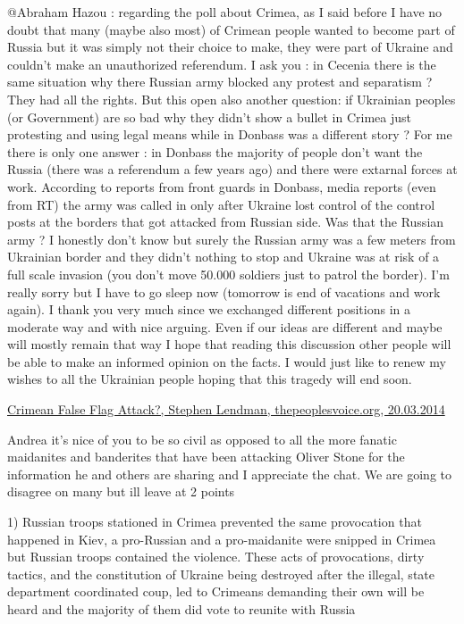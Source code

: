 \begin{itemize}
\begin{itemize}

@Abraham Hazou : regarding the poll about Crimea, as I said before I have no
doubt that many (maybe also most) of Crimean people wanted to become part of
Russia but it was simply not their choice to make, they were part of Ukraine
and couldn't make an unauthorized referendum. I ask you : in Cecenia there is
the same situation why there Russian army blocked any protest and separatism ?
They had all the rights. But this open also another question: if Ukrainian
peoples (or Government) are so bad why they didn't show a bullet in Crimea just
protesting and using legal means while in Donbass was a different story ? For
me there is only one answer : in Donbass the majority of people don't want the
Russia (there was a referendum a few years ago) and there were extarnal forces
at work. According to reports from front guards in Donbass, media reports (even
from RT) the army was called in only after Ukraine lost control of the control
posts at the borders that got attacked from Russian side. Was that the Russian
army ? I honestly don't know but surely the Russian army was a few meters from
Ukrainian border and they didn't nothing to stop and Ukraine was at risk of a
full scale invasion (you don't move 50.000 soldiers just to patrol the border).
I'm really sorry but I have to go sleep now (tomorrow is end of vacations and
work again). I thank you very much since we exchanged different positions in a
moderate way and with nice arguing. Even if our ideas are different and maybe
will mostly remain that way I hope that reading this discussion other people
will be able to make an informed opinion on the facts. I would just like to
renew my wishes to all the Ukrainian people hoping that this tragedy will end
soon.


\href{http://www.thepeoplesvoice.org/TPV3/Voices.php/2014/03/20/crimean-false-flag-attack}{%
Crimean False Flag Attack?, Stephen Lendman, thepeoplesvoice.org, 20.03.2014%
}

Andrea it's nice of you to be so civil as opposed to all the more fanatic
maidanites and banderites that have been attacking Oliver Stone for the
information he and others are sharing and I appreciate the chat. We are going
to disagree on many but ill leave at 2 points

1) Russian troops stationed in Crimea prevented the same provocation that
happened in Kiev, a pro-Russian and a pro-maidanite were snipped in Crimea but
Russian troops contained the violence. These acts of provocations, dirty
tactics, and the constitution of Ukraine being destroyed after the illegal,
state department coordinated coup, led to Crimeans demanding their own will be
heard and the majority of them did vote to reunite with Russia


\end{itemize}
\end{itemize}
